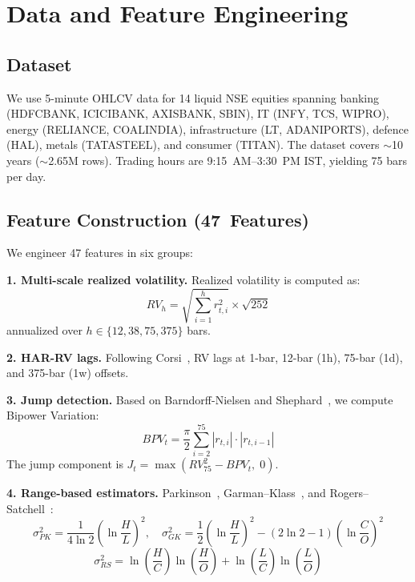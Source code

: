 \documentclass[runningheads]{llncs}
\begin{document}
\section{Data and Feature Engineering}\label{sec:data}

\subsection{Dataset}
We use 5-minute OHLCV data for 14 liquid NSE equities spanning banking (HDFCBANK, ICICIBANK, AXISBANK, SBIN), IT (INFY, TCS, WIPRO), energy (RELIANCE, COALINDIA), infrastructure (LT, ADANIPORTS), defence (HAL), metals (TATASTEEL), and consumer (TITAN). The dataset covers $\sim$10 years ($\sim$2.65M rows). Trading hours are 9:15~AM--3:30~PM IST, yielding 75 bars per day.

\subsection{Feature Construction (47~Features)}
We engineer 47 features in six groups:

\noindent\textbf{1. Multi-scale realized volatility.} Realized volatility is computed as:
\begin{equation}
RV_h = \sqrt{\sum_{i=1}^{h} r_{t,i}^2} \times \sqrt{252}
\end{equation}
annualized over $h \in \{12, 38, 75, 375\}$ bars.

\noindent\textbf{2. HAR-RV lags.} Following Corsi~\cite{corsi2009}, RV lags at 1-bar, 12-bar (1h), 75-bar (1d), and 375-bar (1w) offsets.

\noindent\textbf{3. Jump detection.} Based on Barndorff-Nielsen and Shephard~\cite{bns2004}, we compute Bipower Variation:
\begin{equation}
BPV_t = \frac{\pi}{2} \sum_{i=2}^{75} |r_{t,i}| \cdot |r_{t,i-1}|
\end{equation}
The jump component is $J_t = \max(RV_{75}^2 - BPV_t,\; 0)$.

\noindent\textbf{4. Range-based estimators.} Parkinson~\cite{parkinson1980}, Garman--Klass~\cite{garman1980}, and Rogers--Satchell~\cite{rogers1991}:
\begin{equation}
\sigma_{PK}^2 = \frac{1}{4\ln 2}\!\left(\ln\frac{H}{L}\right)^{\!2}, \quad
\sigma_{GK}^2 = \frac{1}{2}\!\left(\ln\frac{H}{L}\right)^{\!2} - (2\ln 2 - 1)\!\left(\ln\frac{C}{O}\right)^{\!2}
\end{equation}
\begin{equation}
\sigma_{RS}^2 = \ln\!\left(\frac{H}{C}\right)\ln\!\left(\frac{H}{O}\right) + \ln\!\left(\frac{L}{C}\right)\ln\!\left(\frac{L}{O}\right)
\end{equation}
\end{document}
